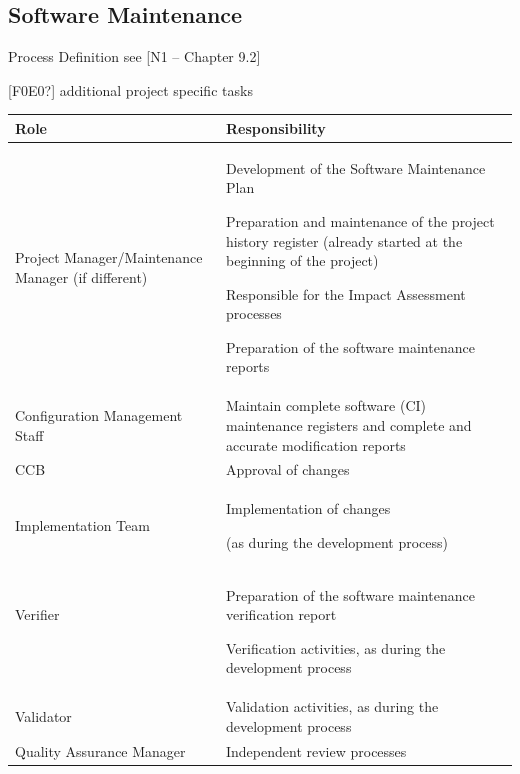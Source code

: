 \documentclass{template/openetcs_article}
\begin{document}
\subsection{Software Maintenance}
Process Definition see [N1 -- Chapter 9.2]

[F0E0?] additional project specific tasks


\begin{flushleft}
\tablefirsthead{}
\tablehead{}
\tabletail{}
\tablelasttail{}
\begin{supertabular}{|m{5cm}|m{9cm}|}
\hline
{}
Role &
Responsibility\\\hline
Project Manager/Maintenance Manager (if different) &
Development of the Software Maintenance Plan

Preparation and maintenance of the project history register (already started at the beginning of the project)

Responsible for the Impact Assessment processes

Preparation of the software maintenance reports\\\hline
Configuration Management Staff &
Maintain complete software (CI) maintenance registers and complete and accurate modification reports\\\hline
CCB &
Approval of changes\\\hline
Implementation Team &
Implementation of changes

(as during the development process)\\\hline
Verifier

~
 &
Preparation of the software maintenance verification report

Verification activities, as during the development process\\\hline
Validator &
Validation activities, as during the development process\\\hline
Quality Assurance Manager &
Independent review processes\\\hline
\end{supertabular}
\end{flushleft}
\end{document}
